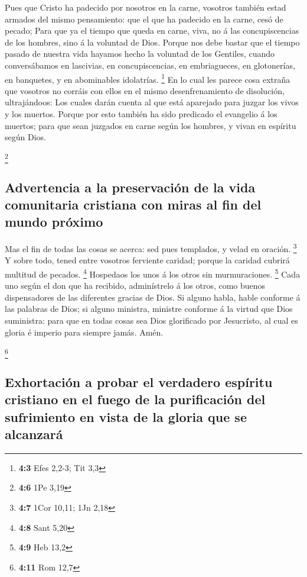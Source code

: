  Pues que Cristo ha padecido por nosotros en la carne,
vosotros también estad armados del mismo pensamiento: que el que ha
padecido en la carne, cesó de pecado;  Para que ya el
tiempo que queda en carne, viva, no á las concupiscencias de los
hombres, sino á la voluntad de Dios.  Porque nos debe
bastar que el tiempo pasado de nuestra vida hayamos hecho la voluntad de
los Gentiles, cuando conversábamos en lascivias, en concupiscencias, en
embriagueces, en glotonerías, en banquetes, y en abominables idolatrías.
\footnote{\textbf{4:3} Efes 2,2-3; Tit 3,3}  En lo cual
les parece cosa extraña que vosotros no corráis con ellos en el mismo
desenfrenamiento de disolución, ultrajándoos:  Los cuales
darán cuenta al que está aparejado para juzgar los vivos y los muertos.
 Porque por esto también ha sido predicado el evangelio á
los muertos; para que sean juzgados en carne según los hombres, y vivan
en espíritu según Dios.

\footnote{\textbf{4:6} 1Pe 3,19}

\hypertarget{advertencia-a-la-preservaciuxf3n-de-la-vida-comunitaria-cristiana-con-miras-al-fin-del-mundo-pruxf3ximo}{%
\subsection{Advertencia a la preservación de la vida comunitaria
cristiana con miras al fin del mundo
próximo}\label{advertencia-a-la-preservaciuxf3n-de-la-vida-comunitaria-cristiana-con-miras-al-fin-del-mundo-pruxf3ximo}}

 Mas el fin de todas las cosas se acerca: sed pues
templados, y velad en oración. \footnote{\textbf{4:7} 1Cor 10,11; 1Jn
  2,18}  Y sobre todo, tened entre vosotros ferviente
caridad; porque la caridad cubrirá multitud de pecados. \footnote{\textbf{4:8}
  Sant 5,20}  Hospedaos los unos á los otros sin
murmuraciones. \footnote{\textbf{4:9} Heb 13,2}  Cada uno
según el don que ha recibido, adminístrelo á los otros, como buenos
dispensadores de las diferentes gracias de Dios.  Si
alguno habla, hable conforme á las palabras de Dios; si alguno ministra,
ministre conforme á la virtud que Dios suministra: para que en todas
cosas sea Dios glorificado por Jesucristo, al cual es gloria é imperio
para siempre jamás. Amén.

\footnote{\textbf{4:11} Rom 12,7}

\hypertarget{exhortaciuxf3n-a-probar-el-verdadero-espuxedritu-cristiano-en-el-fuego-de-la-purificaciuxf3n-del-sufrimiento-en-vista-de-la-gloria-que-se-alcanzaruxe1}{%
\subsection{Exhortación a probar el verdadero espíritu cristiano en el
fuego de la purificación del sufrimiento en vista de la gloria que se
alcanzará}\label{exhortaciuxf3n-a-probar-el-verdadero-espuxedritu-cristiano-en-el-fuego-de-la-purificaciuxf3n-del-sufrimiento-en-vista-de-la-gloria-que-se-alcanzaruxe1}}

